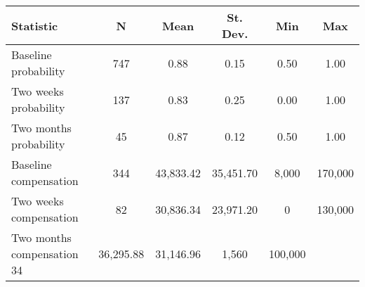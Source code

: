 
\begin{tabular}{@{\extracolsep{5pt}}lccccc} 
\toprule
Statistic & \multicolumn{1}{c}{N} & \multicolumn{1}{c}{Mean} & \multicolumn{1}{c}{St. Dev.} & \multicolumn{1}{c}{Min} & \multicolumn{1}{c}{Max} \\ 
\midrule
\midrule
Baseline probability & 747 & 0.88 & 0.15 & 0.50 & 1.00 \\ 
Two weeks probability & 137 & 0.83 & 0.25 & 0.00 & 1.00 \\ 
Two months probability & 45 & 0.87 & 0.12 & 0.50 & 1.00 \\ 
Baseline compensation & 344 & 43,833.42 & 35,451.70 & 8,000 & 170,000 \\ 
Two weeks compensation & 82 & 30,836.34 & 23,971.20 & 0 & 130,000 \\ 
Two months compensation 34 & 36,295.88 & 31,146.96 & 1,560 & 100,000 \\ 
\bottomrule
\end{tabular} 
